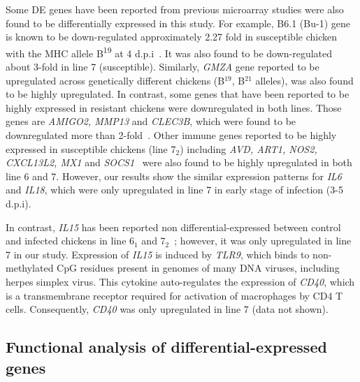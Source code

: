 \documentclass[10pt]{article}
\begin{document}
Some DE genes have been reported from previous microarray studies were also
found to be differentially expressed in this study.  For example, B6.1 (Bu-1)
gene is known to be down-regulated approximately 2.27 fold in susceptible
chicken with the MHC allele B\textsuperscript{19} at 4
d.p.i~\cite{sarson2008transcriptional}.  It was also found to be down-regulated
about 3-fold in line 7 (susceptible).  Similarly, {\em GMZA} gene reported to be
upregulated across genetically different chickens (B$^{19}$, B$^{21}$ alleles),
was also found to be highly upregulated.  In contrast, some genes that have been
reported to be highly expressed in resistant chickens were downregulated in both
lines. Those genes are {\em AMIGO2, MMP13} and {\em CLEC3B}, which were found to
be downregulated more than 2-fold~\cite{sarson2008transcriptional}.
Other immune genes reported to be highly expressed in susceptible chickens (line
7$_{2}$) including {\em AVD, ART1, NOS2, CXCL13L2, MX1} and {\em
SOCS1}~\cite{smith2011systems} were also found to be highly upregulated in both
line 6 and 7.  However, our results show the similar expression patterns for
{\em IL6} and {\em IL18}, which were only upregulated in line 7 in early stage
of infection (3-5 d.p.i).

In contrast, {\em IL15} has been reported non differential-expressed between
control and infected chickens in line 6$_{1}$ and
7$_{2}$~\cite{kaiser2003differential}; however, it was only upregulated in line
7 in our study.  Expression of {\em IL15} is induced by {\em TLR9}, which binds
to non-methylated CpG residues present in genomes of many DNA viruses, including
herpes simplex virus.  This cytokine auto-regulates the expression of {\em
CD40}, which is a transmembrane receptor required for activation of macrophages
by CD4 T cells.  Consequently, {\em CD40} was only upregulated in line 7 (data
not shown).


\subsection*{Functional analysis of differential-expressed genes}
\end{document}
